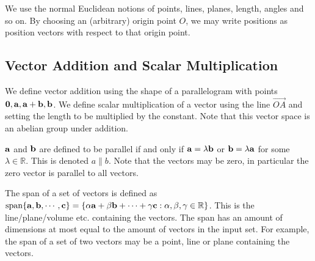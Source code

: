 We use the normal Euclidean notions of points, lines, planes, length, angles and so on.
By choosing an (arbitrary) origin point \(O\), we may write positions as position vectors with respect to that origin point.

\subsection{Vector Addition and Scalar Multiplication}
We define vector addition using the shape of a parallelogram with points \(\vb 0, \vb a, \vb a + \vb b, \vb b\).
We define scalar multiplication of a vector using the line \(\overrightarrow{OA}\) and setting the length to be multiplied by the constant.
Note that this vector space is an abelian group under addition.
\begin{definition}
	\(\vb a\) and \(\vb b\) are defined to be parallel if and only if \(\vb a = \lambda \vb b\) or \(\vb b = \lambda \vb a\) for some \(\lambda \in \mathbb R\).
	This is denoted \(a \parallel b\).
	Note that the vectors may be zero, in particular the zero vector is parallel to all vectors.
\end{definition}
\begin{definition}
	The span of a set of vectors is defined as \(\operatorname{span} \{\vb a, \vb b, \cdots, \vb c\} = \{ \alpha \vb a + \beta \vb b + \cdots + \gamma \vb c: \alpha, \beta, \gamma \in \mathbb R \}\).
	This is the line/plane/volume etc.
	containing the vectors.
	The span has an amount of dimensions at most equal to the amount of vectors in the input set.
	For example, the span of a set of two vectors may be a point, line or plane containing the vectors.
\end{definition}

